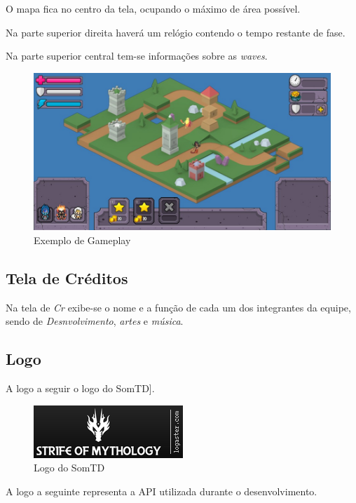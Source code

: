 \documentclass[11pt]{article} %
\begin{document}
O mapa fica no centro da tela, ocupando o máximo de área possível.

Na parte superior direita haverá um relógio contendo o tempo restante de fase.

Na parte superior central tem-se informações sobre as \textit{waves}.

\begin{figure}[!htp]
\centering
\includegraphics[scale=0.5]{res/gameplay.jpg}
\caption{Exemplo de Gameplay}
\end{figure}

\newpage
\subsection{Tela de Créditos}

Na tela de \textit{Cr} exibe-se o nome e a função de cada um dos integrantes da equipe, sendo de \textit{Desnvolvimento}, \textit{artes} e \textit{música}.

\newpage

\subsection{Logo}

A logo a seguir o logo do SomTD].
\begin{figure}[!htp]
\centering
\includegraphics[scale=1.1]{res/logo.png}
\caption{Logo do SomTD}
\label{Logo do SomTD}
\end{figure}

A logo a seguinte representa a API utilizada durante o desenvolvimento.
\end{document}
